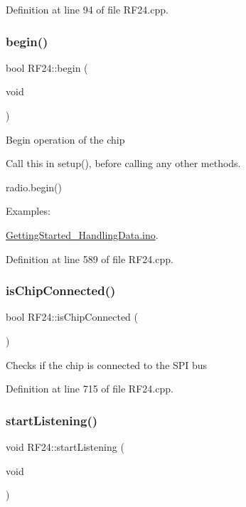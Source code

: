 Definition at line 94 of file R\+F24.\+cpp.

\mbox{\label{classRF24_a048a20c73c7d9b2e02dcbae6fb9c4ba8}} 
\subsubsection{\texorpdfstring{begin()}{begin()}}
{\footnotesize\ttfamily bool R\+F24\+::begin (\begin{DoxyParamCaption}\item[{void}]{ }\end{DoxyParamCaption})}

Begin operation of the chip

Call this in setup(), before calling any other methods. 
\begin{DoxyCode}
radio.begin() 
\end{DoxyCode}
 \begin{Desc}
\item[Examples\+: ]\par
\hyperlink{GettingStarted_HandlingData_8ino-example}{Getting\+Started\+\_\+\+Handling\+Data.\+ino}.\end{Desc}


Definition at line 589 of file R\+F24.\+cpp.

\mbox{\label{classRF24_ac224c55270d26dbe7b4f3492ea3056b5}} 
\subsubsection{\texorpdfstring{is\+Chip\+Connected()}{isChipConnected()}}
{\footnotesize\ttfamily bool R\+F24\+::is\+Chip\+Connected (\begin{DoxyParamCaption}{ }\end{DoxyParamCaption})}

Checks if the chip is connected to the S\+PI bus 

Definition at line 715 of file R\+F24.\+cpp.

\mbox{\label{classRF24_a30a2733a3889bdc331fe2d2f4f0f7b39}} 
\subsubsection{\texorpdfstring{start\+Listening()}{startListening()}}
{\footnotesize\ttfamily void R\+F24\+::start\+Listening (\begin{DoxyParamCaption}\item[{void}]{ }\end{DoxyParamCaption})}


